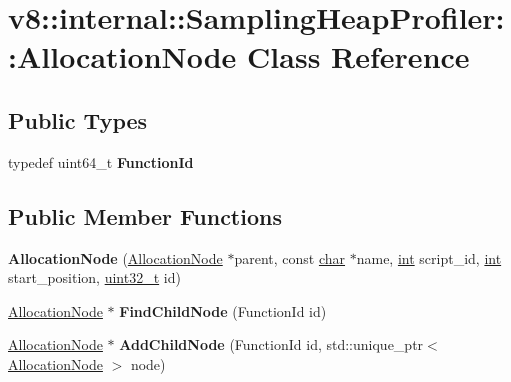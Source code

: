 \hypertarget{classv8_1_1internal_1_1SamplingHeapProfiler_1_1AllocationNode}{}\section{v8\+:\+:internal\+:\+:Sampling\+Heap\+Profiler\+:\+:Allocation\+Node Class Reference}
\label{classv8_1_1internal_1_1SamplingHeapProfiler_1_1AllocationNode}
\subsection*{Public Types}
\begin{DoxyCompactItemize}
\item 
\mbox{\label{classv8_1_1internal_1_1SamplingHeapProfiler_1_1AllocationNode_a0c78c3032878f2beb0c5bcfd175c8630}} 
typedef uint64\+\_\+t {\bfseries Function\+Id}
\end{DoxyCompactItemize}
\subsection*{Public Member Functions}
\begin{DoxyCompactItemize}
\item 
\mbox{\label{classv8_1_1internal_1_1SamplingHeapProfiler_1_1AllocationNode_a81a8ee52bbe5de9b01a49b72892da056}} 
{\bfseries Allocation\+Node} (\mbox{\hyperlink{classv8_1_1internal_1_1SamplingHeapProfiler_1_1AllocationNode}{Allocation\+Node}} $\ast$parent, const \mbox{\hyperlink{classchar}{char}} $\ast$name, \mbox{\hyperlink{classint}{int}} script\+\_\+id, \mbox{\hyperlink{classint}{int}} start\+\_\+position, \mbox{\hyperlink{classuint32__t}{uint32\+\_\+t}} id)
\item 
\mbox{\label{classv8_1_1internal_1_1SamplingHeapProfiler_1_1AllocationNode_ab07dee34f8ab069b8402830eb318b3b8}} 
\mbox{\hyperlink{classv8_1_1internal_1_1SamplingHeapProfiler_1_1AllocationNode}{Allocation\+Node}} $\ast$ {\bfseries Find\+Child\+Node} (Function\+Id id)
\item 
\mbox{\label{classv8_1_1internal_1_1SamplingHeapProfiler_1_1AllocationNode_af9a29d57c2f6b5c64b55daec949e6194}} 
\mbox{\hyperlink{classv8_1_1internal_1_1SamplingHeapProfiler_1_1AllocationNode}{Allocation\+Node}} $\ast$ {\bfseries Add\+Child\+Node} (Function\+Id id, std\+::unique\+\_\+ptr$<$ \mbox{\hyperlink{classv8_1_1internal_1_1SamplingHeapProfiler_1_1AllocationNode}{Allocation\+Node}} $>$ node)
\end{DoxyCompactItemize}
